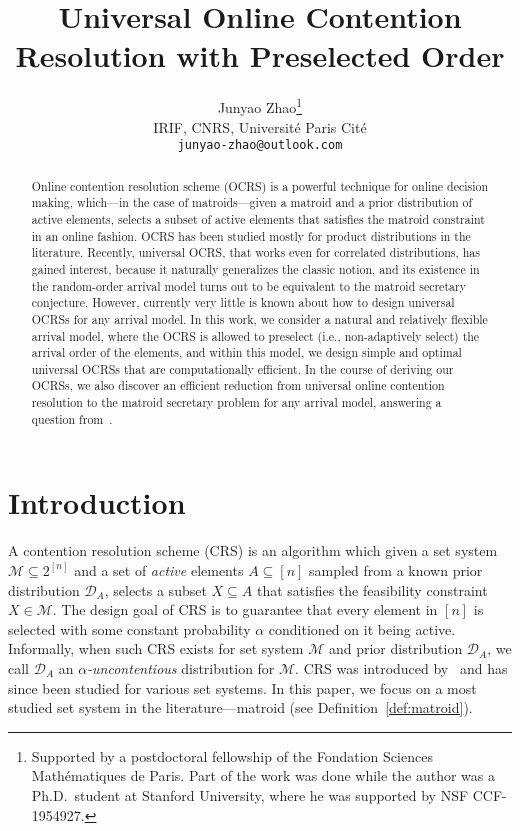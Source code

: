 \documentclass[11pt]{article}
\title{Universal Online Contention Resolution with Preselected Order}
\author{Junyao Zhao\thanks{Supported by a postdoctoral fellowship of the Fondation Sciences Mathématiques de Paris. Part of the work was done while the author was a Ph.D.~student at Stanford University, where he was supported by NSF CCF-1954927.}\\ IRIF, CNRS, Université Paris Cité\\\texttt{junyao-zhao@outlook.com}}
\date{}
\newcommand{\D}{\mathcal D}
\newcommand{\M}{{\mathcal M}}
\begin{document}
\maketitle

\begin{abstract}
Online contention resolution scheme (OCRS) is a powerful technique for online decision making, which---in the case of matroids---given a matroid and a prior distribution of active elements, selects a subset of active elements that satisfies the matroid constraint in an online fashion. OCRS has been studied mostly for product distributions in the literature. Recently, universal OCRS, that works even for correlated distributions, has gained interest, because it naturally generalizes the classic notion, and its existence in the random-order arrival model turns out to be equivalent to the matroid secretary conjecture. However, currently very little is known about how to design universal OCRSs for any arrival model. In this work, we consider a natural and relatively flexible arrival model, where the OCRS is allowed to preselect (i.e., non-adaptively select) the arrival order of the elements, and within this model, we design simple and optimal universal OCRSs that are computationally efficient. In the course of deriving our OCRSs, we also discover an efficient reduction from universal online contention resolution to the matroid secretary problem for any arrival model, answering a question from~\citet{dughmi2020outer}.
\end{abstract}

\section{Introduction}
A contention resolution scheme (CRS) is an algorithm which given a set system $\M\subseteq2^{[n]}$ and a set of \emph{active} elements $A\subseteq[n]$ sampled from a known prior distribution $\D_A$, selects a subset $X\subseteq A$ that satisfies the feasibility constraint $X\in\M$. The design goal of CRS is to guarantee that every element in $[n]$ is selected with some constant probability $\alpha$ conditioned on it being active. Informally, when such CRS exists for set system $\M$ and prior distribution $\D_A$, we call $\D_A$ an \emph{$\alpha$-uncontentious} distribution for $\M$. CRS was introduced by~\citet{chekuri2014submodular} and has since been studied for various set systems. In this paper, we focus on a most studied set system in the literature---matroid (see Definition~\ref{def:matroid}).
\end{document}
